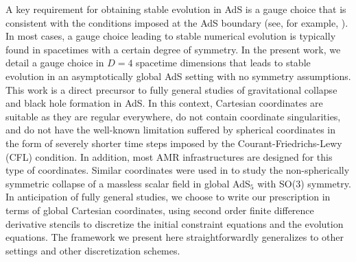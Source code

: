 \documentclass[a4paper,11pt]{article}
\numberwithin{equation}{section}
\begin{document}
A key requirement for obtaining stable evolution in AdS is a gauge choice that is consistent with the conditions imposed at the AdS boundary (see, for example, \cite{Bantilan:2012vu}).
In most cases, a gauge choice leading to stable numerical evolution is typically found in spacetimes with a certain degree of symmetry.
In the present work, we detail a gauge choice in $D=4$ spacetime dimensions that leads to stable evolution in an asymptotically global AdS setting with no symmetry assumptions.
This work is a direct precursor to fully general studies of gravitational collapse and black hole formation in AdS.
In this context, Cartesian coordinates are suitable as they are regular everywhere, do not contain coordinate singularities, and do not have the well-known limitation suffered by spherical coordinates in the form of severely shorter time steps imposed by the Courant-Friedrichs-Lewy (CFL) condition. In addition, most AMR infrastructures are designed for this type of coordinates. 
Similar coordinates were used in \cite{Bantilan:2017kok} to study the non-spherically symmetric collapse of a massless scalar field in global AdS$_5$ with SO(3) symmetry. 
In anticipation of fully general studies, we choose to write our prescription in terms of global Cartesian coordinates, using second order finite difference derivative stencils to discretize the initial constraint equations and the evolution equations. 
The framework we present here straightforwardly generalizes to other settings and other discretization schemes.
\end{document}
